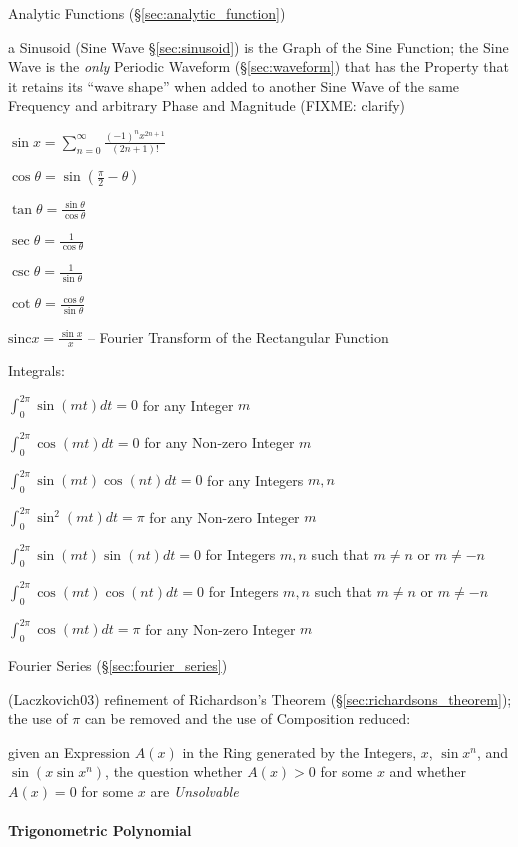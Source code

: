 Analytic Functions (\S\ref{sec:analytic_function})

a Sinusoid (Sine Wave \S\ref{sec:sinusoid}) is the Graph of the Sine Function;
the Sine Wave is the \emph{only} Periodic Waveform (\S\ref{sec:waveform}) that
has the Property that it retains its ``wave shape'' when added to another Sine
Wave of the same Frequency and arbitrary Phase and Magnitude (FIXME: clarify)

$\sin x = \sum_{n=0}^\infty \frac{(-1)^n x^{2n+1}}{(2n + 1)!}$

$\cos\theta= \sin(\frac{\pi}{2} - \theta)$

$\tan\theta = \frac{\sin\theta}{\cos\theta}$

$\sec\theta = \frac{1}{\cos\theta}$

$\csc\theta = \frac{1}{\sin\theta}$

$\cot\theta = \frac{\cos\theta}{\sin\theta}$

$\mathrm{sinc} x = \frac{\sin x}{x}$ -- Fourier Transform of the Rectangular
Function

Integrals:

$\int_0^{2\pi} \sin(mt)dt = 0$ for any Integer $m$

$\int_0^{2\pi} \cos(mt)dt = 0$ for any Non-zero Integer $m$

$\int_0^{2\pi} \sin(mt)\cos(nt)dt = 0$ for any Integers $m,n$

$\int_0^{2\pi} \sin^2(mt)dt = \pi$ for any Non-zero Integer $m$

$\int_0^{2\pi} \sin(mt)\sin(nt)dt = 0$ for Integers $m,n$ such that $m\neq{n}$
or $m\neq{-n}$

$\int_0^{2\pi} \cos(mt)\cos(nt)dt = 0$ for Integers $m,n$ such that $m\neq{n}$
or $m\neq{-n}$

$\int_0^{2\pi} \cos(mt)dt = \pi$ for any Non-zero Integer $m$

\fist Fourier Series (\S\ref{sec:fourier_series})

(Laczkovich03) refinement of Richardson's Theorem
(\S\ref{sec:richardsons_theorem}); the use of $\pi$ can be removed and the use
of Composition reduced:

given an Expression $A(x)$ in the Ring generated by the Integers, $x$, $\sin
x^n$, and $\sin(x \sin x^n)$, the question whether $A(x) > 0$ for some $x$ and
whether $A(x) = 0$ for some $x$ are \emph{Unsolvable}



\paragraph{Trigonometric Polynomial}\label{sec:trigonometric_polynomial}\hfill

